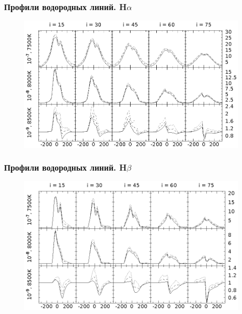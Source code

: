 \documentclass{beamer}
\begin{document}
\begin{frame}
\frametitle{Профили водородных линий. H$\alpha$}
\begin{figure}[h]
\centering
\includegraphics[width=\textwidth]{hot_5_Ha.eps}
\end{figure}
\end{frame}


\begin{frame}
\frametitle{Профили водородных линий. H$\beta$}
\begin{figure}[h]
\centering
\includegraphics[width=\textwidth]{hot_5_Hb.eps}
\end{figure}
\end{frame}
\end{document}
